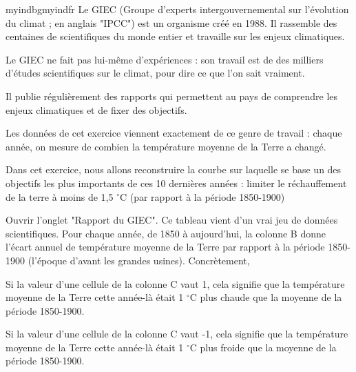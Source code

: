 \documentclass{exam}
\begin{document}
\begin{Indication}{myindbg}{myindfr}
  Le GIEC (Groupe d'experts intergouvernemental sur l'évolution du climat ; en anglais "IPCC") est un organisme créé en 1988. Il rassemble des centaines de scientifiques du monde entier et travaille sur les enjeux climatiques.
  \begin{compactitem}
    \item Le GIEC ne fait pas lui-même d'expériences : son travail est de  des milliers d'études scientifiques sur le climat, pour dire ce que l'on sait vraiment.
    \item Il publie régulièrement des rapports qui permettent au pays de comprendre les enjeux climatiques et de fixer des objectifs. 
    \item Les données de cet exercice viennent exactement de ce genre de travail : chaque année, on mesure de combien la température moyenne de la Terre a changé.
  \par
  Dans cet exercice, nous allons reconstruire la courbe sur laquelle se base un des objectifs les plus importants de ces 10 dernières années : limiter le réchauffement de la terre à moins de 1,5 \(^\circ\text{C}\) (par rapport à la période 1850-1900)
  \end{compactitem}
\end{Indication}

Ouvrir l'onglet "Rapport du GIEC". Ce tableau vient d'un vrai jeu de données scientifiques. Pour chaque année, de 1850 à aujourd'hui, la colonne B donne l'écart annuel de température moyenne de la Terre par rapport à la période 1850-1900 (l'époque d'avant les grandes usines). Concrètement,
\begin{compactitem}
    \item Si la valeur d'une cellule de la colonne C vaut 1, cela signifie que la température moyenne de la Terre cette année-là était 1 \(^\circ\text{C}\) plus chaude que la moyenne de la période 1850-1900.
    \item Si la valeur d'une cellule de la colonne C vaut -1, cela signifie que la température moyenne de la Terre cette année-là était 1 \(^\circ\text{C}\) plus froide que la moyenne de la période 1850-1900.
  \end{compactitem}
\end{document}
